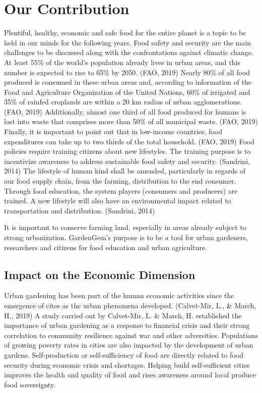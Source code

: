 \chapter{Our Contribution} %

\label{Chapter:OurContribution}

Plentiful, healthy, economic and safe food for the entire planet is a topic to be held in our minds for the following years. Food safety and security are the main challenges to be discussed along with the confrontations against climatic change. At least 55\% of the world’s population already lives in urban areas, and this number is expected to rise to 65\% by 2050. (FAO, 2019) Nearly 80\% of all food produced is consumed in these urban areas and, according to information of the Food and Agriculture Organization of the United Nations, 60\% of irrigated and 35\% of rainfed croplands are within a 20 km radius of urban agglomerations. (FAO, 2019) Additionally, almost one third of all food produced for humans is lost into waste that comprises more than 50\% of all municipal waste. (FAO, 2019) Finally, it is important to point out that in low-income countries, food expenditures can take up to two thirds of the total household. (FAO, 2019) Food policies require training citizens about new lifestyles. The training purpose is to incentivize awareness to address sustainable food safety and security. (Sandrini, 2014)
The lifestyle of human kind shall be amended, particularly in regards of our food supply chain, from the farming, distribution to the end consumer. Through food education, the system players (consumers and producers) are trained. A new lifestyle will also have an environmental impact related to transportation and distribution. (Sandrini, 2014)

It is important to conserve farming land, especially in areas already subject to strong urbanization. GardenGem’s purpose is to be a tool for urban gardeners, researchers and citizens for food education and urban agriculture.

\section{Impact on the Economic Dimension}

Urban gardening has been part of the human economic activities since the emergence of cites as the urban phenomena developed. (Calvet-Mir, L., \& March, H., 2019) A study carried out by Calvet-Mir, L. \& March, H. established the importance of urban gardening as a response to financial crisis and their strong correlation to community resilience against war and other adversities. Populations of growing poverty rates in cities are also impacted by the development of urban gardens. Self-production or self-sufficiency of food are directly related to food security during economic crisis and shortages. Helping build self-sufficient cities improves the health and quality of food and rises awareness around local produce food sovereignty.

